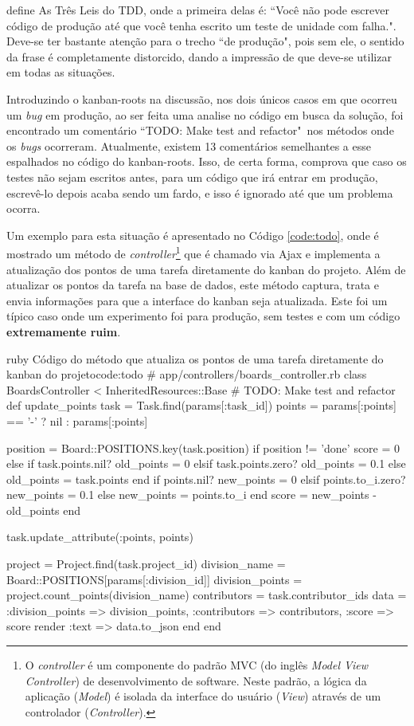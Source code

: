  define As Três Leis do TDD, onde a primeira delas é: ``Você não pode escrever código de produção até que você tenha escrito um teste de unidade com falha.". Deve-se ter bastante atenção para o trecho ``de produção", pois sem ele, o sentido da frase é completamente distorcido, dando a impressão de que deve-se utilizar em todas as situações.

Introduzindo o kanban-roots na discussão, nos dois únicos casos em que ocorreu um \textit{bug} em produção, ao ser feita uma analise no código em busca da solução, foi encontrado um comentário ``TODO: Make test and refactor"\ nos métodos onde os \textit{bugs} ocorreram. Atualmente, existem 13 comentários semelhantes a esse espalhados no código do kanban-roots. Isso, de certa forma, comprova que caso os testes não sejam escritos antes, para um código que irá entrar em produção, escrevê-lo depois acaba sendo um fardo, e isso é ignorado até que um problema ocorra.

Um exemplo para esta situação é apresentado no Código \ref{code:todo}, onde é mostrado um método de \textit{controller}\footnote{O \textit{controller} é um componente do padrão MVC (do inglês \textit{Model View Controller}) de desenvolvimento de software. Neste padrão, a lógica da aplicação (\textit{Model}) é isolada da interface do usuário (\textit{View}) através de um controlador (\textit{Controller}).} que é chamado via Ajax e implementa a atualização dos pontos de uma tarefa diretamente do kanban do projeto. Além de atualizar os pontos da tarefa na base de dados, este método captura, trata e envia informações para que a interface do kanban seja atualizada. Este foi um típico caso onde um experimento foi para produção, sem testes e com um código \textbf{extremamente ruim}.

\begin{mycode}{ruby}%
{Código do método que atualiza os pontos de uma tarefa diretamente do kanban do projeto}{code:todo}
# app/controllers/boards_controller.rb
class BoardsController < InheritedResources::Base
  # TODO: Make test and refactor
  def update_points
    task = Task.find(params[:task_id])
    points = params[:points] == '-' ? nil : params[:points]

    position = Board::POSITIONS.key(task.position)
    if position != 'done'
      score = 0
    else
      if task.points.nil?
        old_points = 0
      elsif task.points.zero?
        old_points = 0.1
      else
        old_points = task.points
      end
      if points.nil?
        new_points = 0
      elsif points.to_i.zero?
        new_points = 0.1
      else
        new_points = points.to_i
      end
      score = new_points - old_points
    end

    task.update_attribute(:points, points)

    project = Project.find(task.project_id)
    division_name = Board::POSITIONS[params[:division_id]]
    division_points = project.count_points(division_name)
    contributors = task.contributor_ids
    data = { :division_points => division_points,
             :contributors => contributors,
             :score => score }
    render :text => data.to_json
  end
end
\end{mycode}

